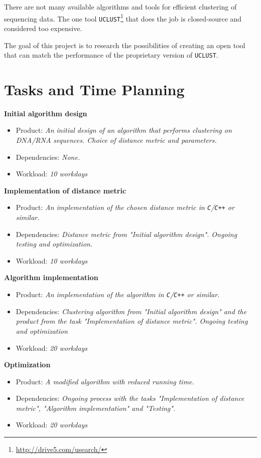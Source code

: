 \documentclass[12pt,a4paper]{article}
\begin{document}
There are not many available algorithms and tools for efficient clustering of
sequencing data. The one tool
\texttt{UCLUST}\footnote{\url{http://drive5.com/usearch/}} that does the job is
closed-source and considered too expensive. %

The goal of this project is to research the possibilities of creating an open
tool that can match the performance of the proprietary version of
\texttt{UCLUST}.


\section{Tasks and Time Planning}
\textbf{Initial algorithm design}
\begin{itemize}
  \item Product: \textit{An initial design of an algorithm that performs
    clustering on DNA/RNA sequences. Choice of distance metric and parameters.}
  \item Dependencies: \textit{None.}
  \item Workload: \textit{10 workdays}
\end{itemize}

\noindent
\textbf{Implementation of distance metric}
\begin{itemize}
  \item Product: \textit{An implementation of the chosen distance metric in
    \texttt{C}/\texttt{C++} or similar.}
  \item Dependencies: \textit{Distance metric from "Initial algorithm design".
    Ongoing testing and optimization.}
  \item Workload: \textit{10 workdays}
\end{itemize}

\noindent
\textbf{Algorithm implementation}
\begin{itemize}
  \item Product: \textit{An implementation of the algorithm in
    \texttt{C}/\texttt{C++} or similar.}
  \item Dependencies: \textit{Clustering algorithm from "Initial algorithm
    design" and the product from the task "Implementation of distance metric".
    Ongoing testing and optimization}
  \item Workload: \textit{20 workdays}
\end{itemize}

\noindent
\textbf{Optimization}
\begin{itemize}
  \item Product: \textit{A modified algorithm with reduced running time.}
  \item Dependencies: \textit{Ongoing process with the tasks "Implementation of
    distance metric", "Algorithm implementation" and "Testing".}
  \item Workload: \textit{20 workdays}
\end{itemize}
\end{document}
